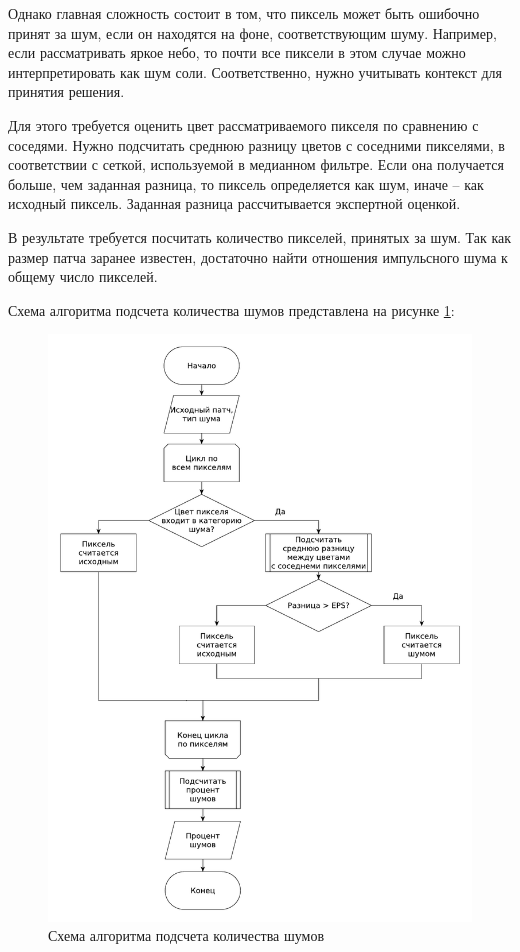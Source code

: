 Однако главная сложность состоит в том, что пиксель может быть ошибочно принят за шум, если он находятся на фоне, соответствующим шуму.
Например, если рассматривать яркое небо, то почти все пиксели в этом случае можно интерпретировать как шум соли.
Соответственно, нужно учитывать контекст для принятия решения.

Для этого требуется оценить цвет рассматриваемого пикселя по сравнению с соседями.
Нужно подсчитать среднюю разницу цветов с соседними пикселями, в соответствии с сеткой, используемой в медианном фильтре.
Если она получается больше, чем заданная разница, то пиксель определяется как шум, иначе -- как исходный пиксель.
Заданная разница рассчитывается экспертной оценкой.

В результате требуется посчитать количество пикселей, принятых за шум. 
Так как размер патча заранее известен, достаточно найти отношения импульсного шума к общему число пикселей.

Схема алгоритма подсчета количества шумов представлена на рисунке \ref{contruct::count}:
\FloatBarrier
\begin{figure}[h]	
	\begin{center}
		\includegraphics[width=\linewidth]{inc/pdf/shumCount.pdf}
	\end{center}
	\captionsetup{justification=centering}
	\caption{Схема алгоритма подсчета количества шумов}
	\label{contruct::count}
\end{figure}
\FloatBarrier

